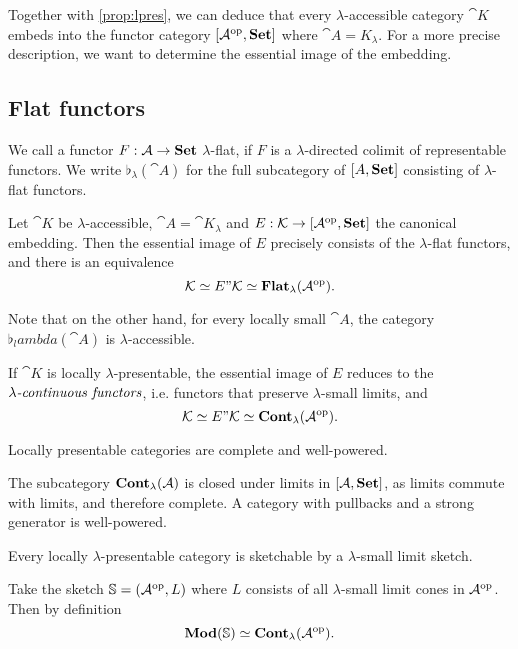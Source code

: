 Together with \ref{prop:lpres}, we can deduce that every $\lambda$-accessible category $\cat K$ embeds into the functor category $[\mathcal{A}^{\textrm{op}},\mathbf{Set}]$ where $\cat A = K_\lambda$. For a more precise description, we want to determine the essential image of the embedding.

\subsection{Flat functors}

\begin{Definition}
We call a functor $F : \mathcal{A} \to \mathbf{Set}$ $\lambda$-flat, if $F$ is a $\lambda$-directed colimit of representable functors. We write $\flat_\lambda(\cat A)$ for the full subcategory of $[A,\mathbf{Set}]$ consisting of $\lambda$-flat functors.
\end{Definition}

\begin{Proposition}
Let $\cat K$ be $\lambda$-accessible, $\cat A = \cat K_\lambda$ and $E : \mathcal{K} \to [\mathcal{A}^{\textrm{op}},\mathbf{Set}]$ the canonical embedding. Then the essential image of $E$ precisely consists of the $\lambda$-flat functors, and there is an equivalence
\[ \mathcal{K} \simeq E\text{''}\mathcal{K} \simeq \mathbf{Flat}_\lambda(\mathcal{A}^{\textrm{op}}). \]
\end{Proposition}

Note that on the other hand, for every locally small $\cat A$, the category $\flat_lambda(\cat A)$ is $\lambda$-accessible.

\begin{Proposition}
If $\cat K$ is locally $\lambda$-presentable, the essential image of $E$ reduces to the $\emph{$\lambda$-continuous functors}$, i.e. functors that preserve $\lambda$-small limits, and
\[ \mathcal{K} \simeq E\text{''}\mathcal{K} \simeq \mathbf{Cont}_\lambda(\mathcal{A}^{\textrm{op}}). \]
\end{Proposition}

\begin{Corollary}
Locally presentable categories are complete and well-powered.
\end{Corollary}
\begin{Proof}
The subcategory $\mathbf{Cont}_\lambda(\mathcal{A})$ is closed under limits in $[\mathcal{A},\mathbf{Set}]$, as limits commute with limits, and therefore complete. A category with pullbacks and a strong generator is well-powered.
\end{Proof}

\begin{Corollary}
Every locally $\lambda$-presentable category is sketchable by a $\lambda$-small limit sketch.
\end{Corollary}
\begin{Proof}
Take the sketch $\mathbb S = (\mathcal{A}^{\textrm{op}}, L)$ where $L$ consists of all $\lambda$-small limit cones in $\mathcal{A}^{\textrm{op}}$. Then by definition
\[ \mathbf{Mod}(\mathbb S) \simeq \mathbf{Cont}_\lambda(\mathcal{A}^{\textrm{op}}). \]
\end{Proof}